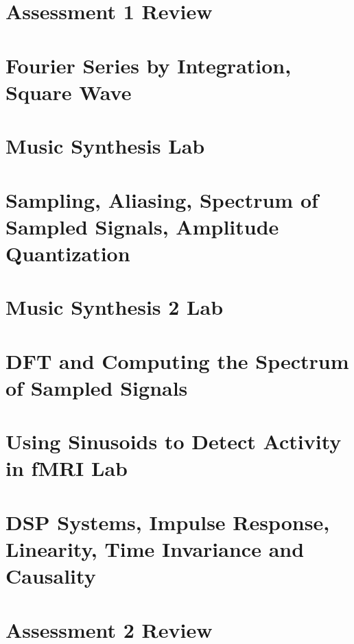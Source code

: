 \documentclass[12pt, letterpaper]{article}
\begin{document}
\section{Assessment 1 Review}
\section{Fourier Series by Integration, Square Wave}
\section{Music Synthesis Lab}
\section{Sampling, Aliasing, Spectrum of Sampled Signals, Amplitude Quantization}
\section{Music Synthesis 2 Lab}
\section{DFT and Computing the Spectrum of Sampled Signals}
\section{Using Sinusoids to Detect Activity in fMRI Lab}
\section{DSP Systems, Impulse Response, Linearity, Time Invariance and Causality}
\section{Assessment 2 Review}
\end{document}
